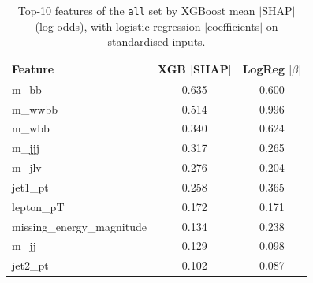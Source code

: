 \begin{table}[!t]
\centering
\caption{Top-10 features of the \texttt{all} set by XGBoost mean $|$SHAP$|$ (log-odds), with logistic-regression $|$coefficients$|$ on standardised inputs.}
\label{tab:importance_ml}
\footnotesize
\setlength{\tabcolsep}{3.5pt}
\begin{tabular}{lcc}
\toprule
Feature & XGB $|$SHAP$|$ & LogReg $|\beta|$ \\
\midrule
m\_bb & 0.635 & 0.600 \\
m\_wwbb & 0.514 & 0.996 \\
m\_wbb & 0.340 & 0.624 \\
m\_jjj & 0.317 & 0.265 \\
m\_jlv & 0.276 & 0.204 \\
jet1\_pt & 0.258 & 0.365 \\
lepton\_pT & 0.172 & 0.171 \\
missing\_energy\_magnitude & 0.134 & 0.238 \\
m\_jj & 0.129 & 0.098 \\
jet2\_pt & 0.102 & 0.087 \\
\bottomrule
\end{tabular}
\end{table}
